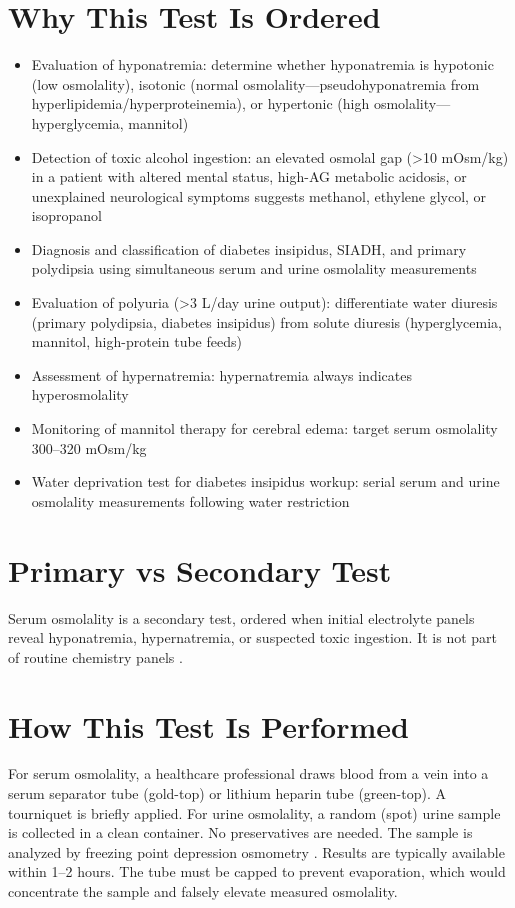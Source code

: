 \section*{Why This Test Is Ordered}
\begin{itemize}
  \item Evaluation of hyponatremia: determine whether hyponatremia is hypotonic (low osmolality), isotonic (normal osmolality---pseudohyponatremia from hyperlipidemia/hyperproteinemia), or hypertonic (high osmolality---hyperglycemia, mannitol)
  \item Detection of toxic alcohol ingestion: an elevated osmolal gap (>10 mOsm/kg) in a patient with altered mental status, high-AG metabolic acidosis, or unexplained neurological symptoms suggests methanol, ethylene glycol, or isopropanol
  \item Diagnosis and classification of diabetes insipidus, SIADH, and primary polydipsia using simultaneous serum and urine osmolality measurements
  \item Evaluation of polyuria (>3 L/day urine output): differentiate water diuresis (primary polydipsia, diabetes insipidus) from solute diuresis (hyperglycemia, mannitol, high-protein tube feeds)
  \item Assessment of hypernatremia: hypernatremia always indicates hyperosmolality
  \item Monitoring of mannitol therapy for cerebral edema: target serum osmolality 300--320 mOsm/kg
  \item Water deprivation test for diabetes insipidus workup: serial serum and urine osmolality measurements following water restriction
\end{itemize}

\section*{Primary vs Secondary Test}
Serum osmolality is a secondary test, ordered when initial electrolyte panels reveal hyponatremia, hypernatremia, or suspected toxic ingestion. It is not part of routine chemistry panels \cite{tierney2023current}.

\section*{How This Test Is Performed}
For serum osmolality, a healthcare professional draws blood from a vein into a serum separator tube (gold-top) or lithium heparin tube (green-top). A tourniquet is briefly applied. For urine osmolality, a random (spot) urine sample is collected in a clean container. No preservatives are needed. The sample is analyzed by freezing point depression osmometry \cite{fischbach2023manual}. Results are typically available within 1--2 hours. The tube must be capped to prevent evaporation, which would concentrate the sample and falsely elevate measured osmolality.

